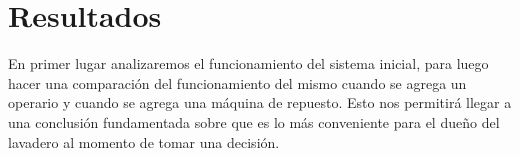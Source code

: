 \documentclass[10pt,a4paper]{article} %
\begin{document}
                                                                                                                                                                                                                                                                                                                                                                                                        \newpage
                                                                                                                                                                                                                                                                                                                                                                                                            \section{Resultados}
                                                                                                                                                                                                                                                                                                                                                                                                                En primer lugar analizaremos el funcionamiento del sistema inicial, para luego hacer una
                                                                                                                                                                                                                                                                                                                                                                                                                comparaci\'on del funcionamiento del mismo cuando se agrega un operario y cuando se agrega una
                                                                                                                                                                                                                                                                                                                                                                                                                m\'aquina de repuesto. Esto nos permitir\'a llegar a una conclusi\'on fundamentada sobre que es
                                                                                                                                                                                                                                                                                                                                                                                                                lo m\'as conveniente para el due\~no del lavadero al momento de tomar una decisi\'on.
                                                                                                                                                                                                                                                                                                                                                                                                                    
\end{document}
